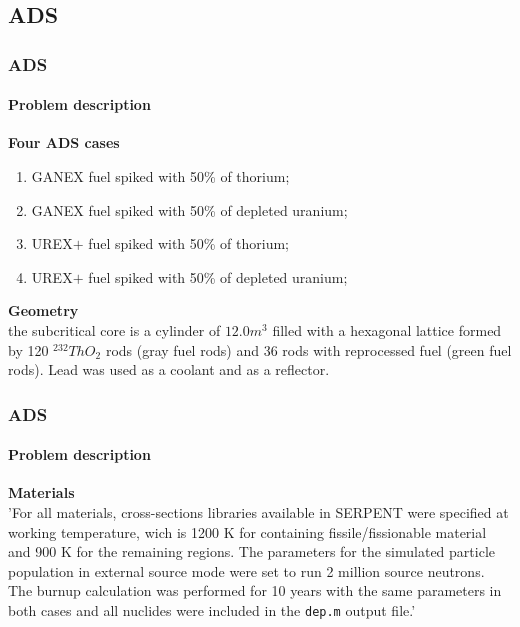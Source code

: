 \documentclass[svgnames,smaller,table]{beamer}
\begin{document}
\subsection{ADS}
\begin{frame}
  \frametitle{ADS}
  \framesubtitle{Problem description}
  \textbf{Four ADS cases}
  \begin{enumerate}
    \item GANEX fuel spiked with 50\% of thorium;
  \item GANEX fuel spiked with 50\% of depleted uranium;
  \item UREX$+$ fuel spiked with 50\% of thorium;
  \item UREX$+$ fuel spiked with 50\% of depleted uranium;
  \end{enumerate}
  \vspace{10px}
  \textbf{Geometry}\\
  the subcritical core is a cylinder of $12.0m^3$ filled with a hexagonal lattice formed by 120 $^{232}ThO_2$ rods (gray fuel rods) and 36 rods with reprocessed fuel (green fuel rods). Lead was used as a coolant and as a reflector.
\end{frame}

\begin{frame}
  \frametitle{ADS}
  \framesubtitle{Problem description}
  \textbf{Materials}\\
  \vspace{10px}
  'For all materials, cross-sections libraries available in SERPENT were specified at working temperature, wich is 1200 K for containing fissile/fissionable material and 900 K for the remaining regions. The parameters for the simulated particle population in external source mode were set to run 2 million source neutrons. The burnup calculation was performed for 10 years with the same parameters in both cases and all nuclides were included in the \texttt{dep.m} output file.'  

\end{frame}
\end{document}
